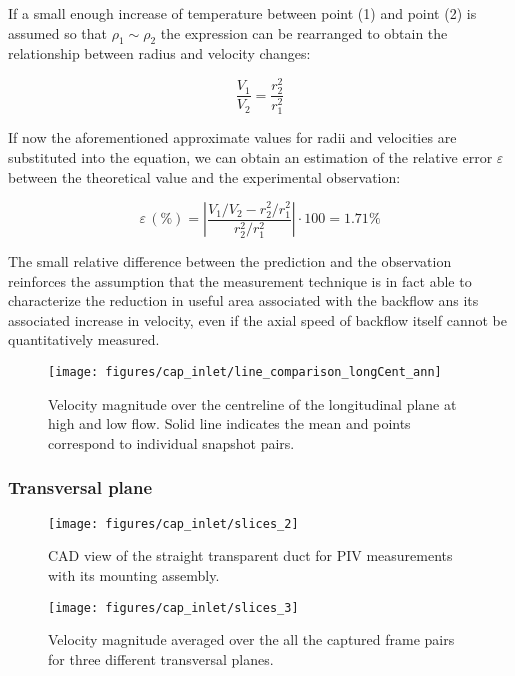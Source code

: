 If a small enough increase of temperature between point (1) and point (2) is assumed so that $\rho_1\sim\rho_2$ the expression can be rearranged to obtain the relationship between radius and velocity changes:

\begin{equation}
  \frac{V_1}{V_2} = \frac{r_2^2}{r_1^2}
\end{equation}

If now the aforementioned approximate values for radii and velocities are substituted into the equation, we can obtain an estimation of the relative error $\varepsilon$ between the theoretical value and the experimental observation:

\begin{equation}
  \varepsilon\, (\%) = \left|\frac{V_1/V_2-r_2^2/r_1^2}{r_2^2/r_1^2}\right| \cdot 100 = 1.71\%
\end{equation}

The small relative difference between the prediction and the observation reinforces the assumption that the measurement technique is in fact able to characterize the reduction in useful area associated with the backflow ans its associated increase in velocity, even if the axial speed of backflow itself cannot be quantitatively measured.

\begin{figure}[htb!]
\centering
\texttt{[image: figures/cap\_inlet/line\_comparison\_longCent\_ann]}
\caption{Velocity magnitude over the centreline of the longitudinal plane at high and low flow. Solid line indicates the mean and points correspond to individual snapshot pairs.}
\label{fig:line_comp_long}
\end{figure}

\subsubsection{Transversal plane}

\begin{figure*}[htb!]
\centering
\texttt{[image: figures/cap\_inlet/slices\_2]}
\caption{CAD view of the straight transparent duct for PIV measurements with its mounting assembly.}
\label{fig:res_trans_20mm}
\end{figure*}

\begin{figure*}[b!]
\centering
\texttt{[image: figures/cap\_inlet/slices\_3]}
\caption{Velocity magnitude averaged over the all the captured frame pairs for three different transversal planes.}
\label{fig:res_trans_20mm}
\end{figure*}

